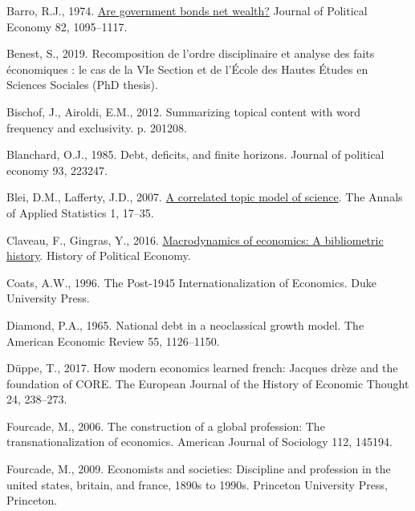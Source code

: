 \documentclass[]{elsarticle} %
\newlength{\cslhangindent}
\newlength{\cslentryspacingunit} %
\newenvironment{CSLReferences}[2] %
 {%
  \setlength{\parindent}{0pt}
  \ifodd #1
  \let\oldpar\par
  \def\par{\hangindent=\cslhangindent\oldpar}
  \fi
  \setlength{\parskip}{#2\cslentryspacingunit}
 }%
 {}
\begin{document}
\hypertarget{refs}{}
\begin{CSLReferences}{1}{0}
\leavevmode{}%
Barro, R.J., 1974. \href{http://www.jstor.org/stable/1830663}{Are
government bonds net wealth?} Journal of Political Economy 82,
1095--1117.

\leavevmode{}%
Benest, S., 2019. Recomposition de l'ordre disciplinaire et analyse des
faits économiques : le cas de la VIe Section et de l'École des Hautes
Études en Sciences Sociales (PhD thesis).

\leavevmode{}%
Bischof, J., Airoldi, E.M., 2012. Summarizing topical content with word
frequency and exclusivity. p. 201208.

\leavevmode{}%
Blanchard, O.J., 1985. Debt, deficits, and finite horizons. Journal of
political economy 93, 223247.

\leavevmode{}%
Blei, D.M., Lafferty, J.D., 2007.
\href{https://www.jstor.org/stable/4537420}{A correlated topic model of
science}. The Annals of Applied Statistics 1, 17--35.

\leavevmode{}%
Claveau, F., Gingras, Y., 2016.
\href{http://hope.dukejournals.org/cgi/content/short/48/4/551?rss=1}{Macrodynamics
of economics: A bibliometric history}. History of Political Economy.

\leavevmode{}%
Coats, A.W., 1996. The Post-1945 Internationalization of Economics. Duke
University Press.

\leavevmode{}%
Diamond, P.A., 1965. National debt in a neoclassical growth model. The
American Economic Review 55, 1126--1150.

\leavevmode{}%
Düppe, T., 2017. How modern economics learned french: Jacques drèze and
the foundation of CORE. The European Journal of the History of Economic
Thought 24, 238--273.

\leavevmode{}%
Fourcade, M., 2006. The construction of a global profession: The
transnationalization of economics. American Journal of Sociology 112,
145194.

\leavevmode{}%
Fourcade, M., 2009. Economists and societies: Discipline and profession
in the united states, britain, and france, 1890s to 1990s. Princeton
University Press, Princeton.


\end{CSLReferences}
\end{document}
